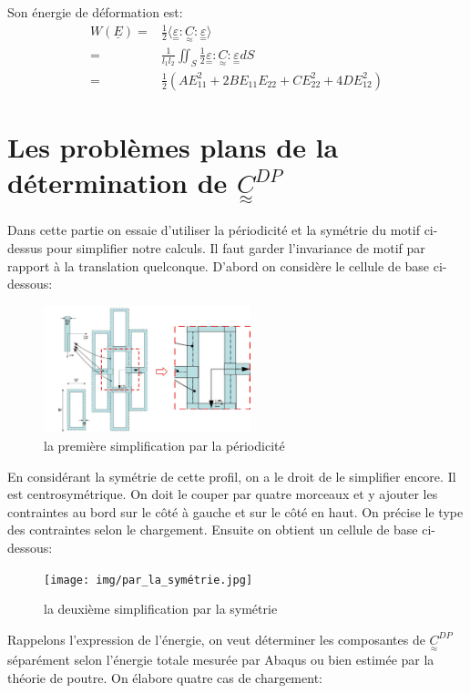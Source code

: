\documentclass{article}
\newcommand\waveC{\underset{\approx}{C}}
\begin{document}
Son énergie de déformation est: 
\begin{align*}
    W(\underline{E})={}& \frac{1}{2}\langle\underset{=}{ \varepsilon}:\waveC:\underset{=}{\varepsilon}\rangle
    \\
    ={}& \frac{1}{l_{1}l_{2}}\iint_{S}\frac{1}{2}\underset{=}{ \varepsilon}:\waveC:\underset{=}{\varepsilon}dS\\
    ={}& \frac{1}{2}(A E_{11}^{2}+2B E_{11}E_{22}+C E_{22}^{2}+4D E_{12}^{2})
\end{align*}



\section{Les problèmes plans de la détermination de $\underset{\approx}{C}^{DP}$}
Dans cette partie on essaie d'utiliser la périodicité et la symétrie du motif ci-dessus pour simplifier notre calculs. Il faut garder l'invariance de motif par rapport à la translation quelconque. D'abord on considère le cellule de base ci-dessous:
\begin{figure}[H]
    \begin{center}
    \includegraphics[width=6cm]{img/par_la_périodicité.JPG}
    \end{center}
    \caption{la première simplification par la périodicité}
    \label{fig_sim1}
\end{figure}
\par
En considérant la symétrie de cette profil, on a le droit de le simplifier encore. Il est centrosymétrique. On doit le couper par quatre morceaux et y ajouter les contraintes au bord sur le côté à gauche et sur le côté en haut. On précise le type des contraintes selon le chargement. Ensuite on obtient un cellule de base ci-dessous:\\ 
\begin{figure}[H]
    \begin{center}
    \texttt{[image: img/par\_la\_symétrie.jpg]}
    \end{center}
    \caption{la deuxième simplification par la symétrie}
    \label{fig_sim2}
\end{figure}
\par
Rappelons l'expression de l'énergie, on veut déterminer les composantes de $\underset{\approx}{C}^{DP}$ séparément selon l'énergie totale mesurée par Abaqus ou bien estimée par la théorie de poutre. On élabore quatre cas de chargement:\\
\end{document}
